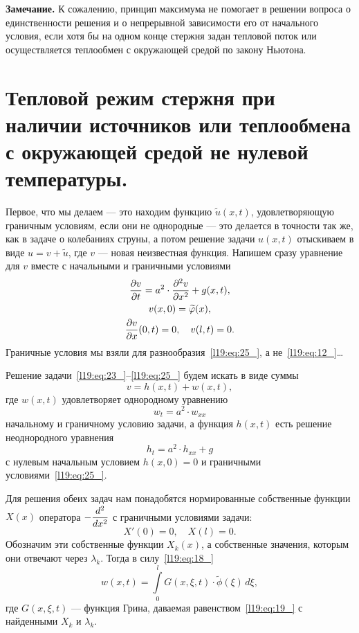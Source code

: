 \vspace{0.2cm}
\noindent\textbf{Замечание. }К сожалению, принцип максимума не помогает в решении вопроса о единственности решения и о непрерывной зависимости его от начального условия, если хотя бы на одном конце стержня задан тепловой поток или осуществляется теплообмен с окружающей средой по закону Ньютона.
\vfill
\newpage
\section[Решение неоднородного уравнения теплопроводности.]{Тепловой режим стержня при наличии источников или теплообмена с окружающей средой не нулевой температуры.}
\label{lecture19section4}
Первое, что мы делаем --- это находим функцию $\tilde{u}(x,t)$, удовлетворяющую граничным условиям, если они не однородные --- это делается в точности так же, как в задаче о колебаниях струны, а потом решение задачи $u(x,t)$ отыскиваем в виде $u=v+\tilde{u}$, где $v$ --- новая неизвестная функция. Напишем сразу уравнение для $v$ вместе с начальными и граничными условиями
\begin{gather}
	\frac{\partial v}{\partial t}=a^2\cdot\frac{\partial^2v}{\partial x^2}+g(x,t),\label{l19:eq:23_}\\
	v(x,0)=\widetilde{\varphi}(x),\label{l19:eq:24_}\\
	\frac{\partial v}{\partial x}(0,t)=0,\quad v(l,t)=0.\label{l19:eq:25_}
\end{gather}
Граничные условия мы взяли для разнообразия~\eqref{l19:eq:25_}, а не~\eqref{l19:eq:12_}\dots

Решение задачи~\eqref{l19:eq:23_}--\eqref{l19:eq:25_} будем искать в виде суммы 
\begin{equation}\label{l19:eq:26_}
	v=h(x,t)+w(x,t),
\end{equation} 
где $w(x,t)$ удовлетворяет однородному уравнению
\begin{equation}\label{l19:eq:27_}
	w_t=a^2\cdot w_{xx}
\end{equation}
начальному и граничному условию задачи, а функция $h(x,t)$ есть решение неоднородного уравнения
\begin{equation}\label{l19:eq:28_}
	h_t=a^2\cdot h_{xx}+g
\end{equation}
с нулевым начальным условием $h(x,0)=0$ и граничными условиями~\eqref{l19:eq:25_}.

Для решения обеих задач нам понадобятся нормированные собственные функции $X(x)$ оператора $\displaystyle-\frac{d^2}{dx^2}$ с граничными условиями задачи:
\begin{equation*}
	X'(0)=0,\quad X(l)=0.
\end{equation*}
Обозначим эти собственные функции $X_k(x)$, а собственные значения, которым они отвечают через $\lambda_k$. Тогда в силу~\eqref{l19:eq:18_}
\begin{equation}\label{l19:eq:29_}
	w(x,t)=\int\limits_0^l G(x,\xi,t)\cdot\widetilde{\phi}(\xi)\,d\xi,
\end{equation}
где $G(x,\xi,t)$ --- функция Грина, даваемая равенством~\eqref{l19:eq:19_} с найденными $X_k$ и $\lambda_k$.


